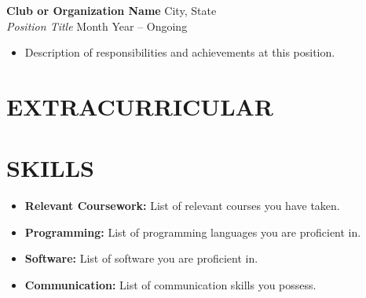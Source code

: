 \documentclass[9pt]{developercv} %
\begin{document}
\textbf{Club or Organization Name} \hfill City, State\\ %
\textit{Position Title} \hfill Month Year – Ongoing %
\begin{itemize}
    \item Description of responsibilities and achievements at this position. %
\end{itemize}


\section*{EXTRACURRICULAR}



%

\section*{SKILLS}
\begin{itemize}
    \item \textbf{Relevant Coursework:} List of relevant courses you have taken. %
    \item \textbf{Programming:} List of programming languages you are proficient in. %
    \item \textbf{Software:} List of software you are proficient in. %
    \item \textbf{Communication:} List of communication skills you possess. %
\end{itemize}

\end{document}
